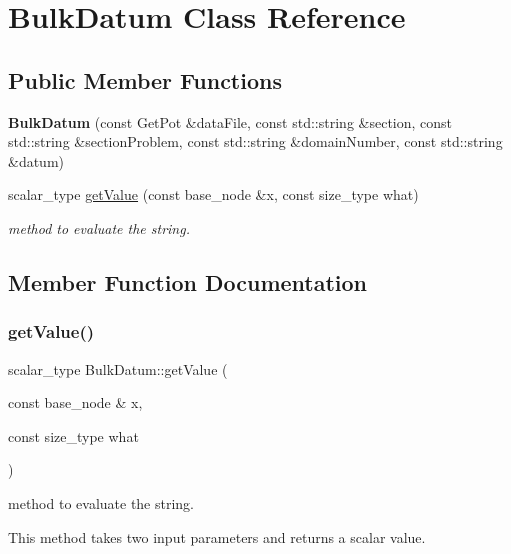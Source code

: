 \hypertarget{classBulkDatum}{}\section{Bulk\+Datum Class Reference}
\label{classBulkDatum}
\subsection*{Public Member Functions}
\begin{DoxyCompactItemize}
\item 
\mbox{\label{classBulkDatum_acad0930f8dadb2ca18d1c947c5f1b5d2}} 
{\bfseries Bulk\+Datum} (const Get\+Pot \&data\+File, const std\+::string \&section, const std\+::string \&section\+Problem, const std\+::string \&domain\+Number, const std\+::string \&datum)
\item 
scalar\+\_\+type \hyperlink{classBulkDatum_ac10d12a1f4a6bd00f7978d085d417389}{get\+Value} (const base\+\_\+node \&x, const size\+\_\+type what)
\begin{DoxyCompactList}\small\item\em method to evaluate the string. \end{DoxyCompactList}\end{DoxyCompactItemize}


\subsection{Member Function Documentation}
\mbox{\label{classBulkDatum_ac10d12a1f4a6bd00f7978d085d417389}} 
\subsubsection{\texorpdfstring{get\+Value()}{getValue()}}
{\footnotesize\ttfamily scalar\+\_\+type Bulk\+Datum\+::get\+Value (\begin{DoxyParamCaption}\item[{const base\+\_\+node \&}]{x,  }\item[{const size\+\_\+type}]{what }\end{DoxyParamCaption})}



method to evaluate the string. 

This method takes two input parameters and returns a scalar value.


